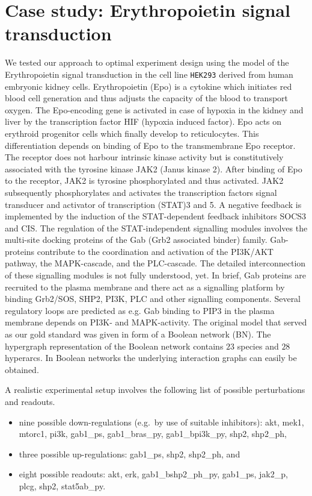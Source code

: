 
\section{Case study: Erythropoietin signal transduction}

We tested our approach to optimal experiment design using the model of the
Erythropoietin signal transduction in the cell line \texttt{HEK293} derived from
human embryonic kidney cells.
Erythropoietin (Epo) is a cytokine which initiates red blood cell generation and
thus adjusts the capacity of the blood to transport oxygen.
The Epo-encoding gene is activated in case of hypoxia in the kidney and liver by
the transcription factor HIF (hypoxia induced factor).
Epo acts on erythroid progenitor cells which finally develop to reticulocytes\cite{wib1}.
This differentiation depends on binding of Epo to the transmembrane Epo receptor.
The receptor does not harbour intrinsic kinase activity but is constitutively
associated with the tyrosine kinase JAK2 (Janus kinase 2).
After binding of Epo to the receptor, JAK2 is tyrosine phosphorylated and thus activated.
JAK2 subsequently phosphorylates and activates the transcription factors signal
transducer and activator of transcription (STAT)3 and 5.
A negative feedback is implemented by the induction of the STAT-dependent feedback
inhibitors SOCS3 and CIS\cite{wib2}.
The regulation of the STAT-independent signalling modules involves the multi-site
docking proteins of the Gab (Grb2 associated binder) family\cite{wib3}.
Gab-proteins contribute to the coordination and activation of the PI3K/AKT pathway,
the MAPK-cascade, and the PLC-cascade.
The detailed interconnection of these signalling modules is not fully understood, yet.
In brief, Gab proteins are recruited to the plasma membrane and there act as a
signalling platform by binding Grb2/SOS, SHP2, PI3K, PLC and other signalling
components.
Several regulatory loops are predicted as e.g. Gab binding to PIP3 in the plasma
membrane depends on PI3K- and MAPK-activity\cite{wib4}.
The original model that served as our gold standard was given in form of a
Boolean network (BN).
The hypergraph representation of the Boolean network contains $23$ species and
$28$ hyperarcs.
In Boolean networks the underlying interaction graphs can easily be obtained\cite{sk06}.

A realistic experimental setup involves the following list of possible
perturbations and readouts.
\begin{itemize}
  \item
  nine possible down-regulations (e.g.\ by use of suitable inhibitors):
  {\sffamily akt},
  {\sffamily mek1},
  {\sffamily mtorc1},
  {\sffamily pi3k},
  {\sffamily gab1\_ps},
  {\sffamily gab1\_bras\_py},
  {\sffamily gab1\_bpi3k\_py},
  {\sffamily shp2, shp2\_ph},
  \item
  three possible up-regulations:
  {\sffamily gab1\_ps},
  {\sffamily shp2},
  {\sffamily shp2\_ph}, and
  \item eight possible readouts:
  {\sffamily akt},
  {\sffamily erk},
  {\sffamily gab1\_bshp2\_ph\_py},
  {\sffamily gab1\_ps},
  {\sffamily jak2\_p},
  {\sffamily plcg},
  {\sffamily shp2},
  {\sffamily stat5ab\_py}.\end{itemize}

